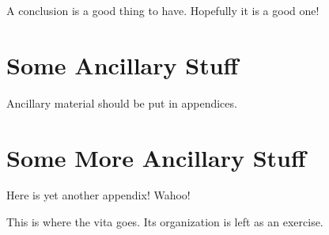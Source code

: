 \documentclass{uicthesi}
\begin{document}
A conclusion is a good thing to have. Hopefully it is a good one!

\appendices
\newpage
\appendix

\chapter{Some Ancillary Stuff}

Ancillary material should be put in appendices.

\chapter{Some More Ancillary Stuff}

Here is yet another appendix! Wahoo!

\nocite{*}
\bibformb

\newpage
\vita
This is where the vita goes.  Its organization is left as an exercise.
\end{document}
